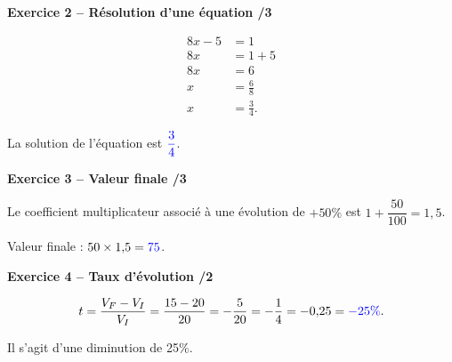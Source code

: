 \documentclass[10pt,a4paper]{article}
\begin{document}
\textbf{Exercice 2 -- Résolution d'une équation \hfill /3}

\[
\begin{aligned}
8x-5&=1\\
8x&=1+5\\
8x&=6\\
x&=\frac{6}{8}\\
x&=\frac{3}{4}.
\end{aligned}
\]

La solution de l'équation est \(\textcolor{blue}{\dfrac{3}{4}}\).

\textbf{Exercice 3 -- Valeur finale \hfill /3}

Le coefficient multiplicateur associé à une évolution de \(+50\%\) est \(1+\dfrac{50}{100}=1{,}5\).

Valeur finale : \(50\times1{,}5=\textcolor{blue}{75}\).


\textbf{Exercice 4 -- Taux d'évolution \hfill /2}

\[
t=\frac{V_F-V_I}{V_I}=\frac{15-20}{20}=-\frac{5}{20}=-\frac{1}{4}=-0{,}25=\textcolor{blue}{-25\%}.
\]

Il s'agit d'une diminution de 25\%.

\end{document}

